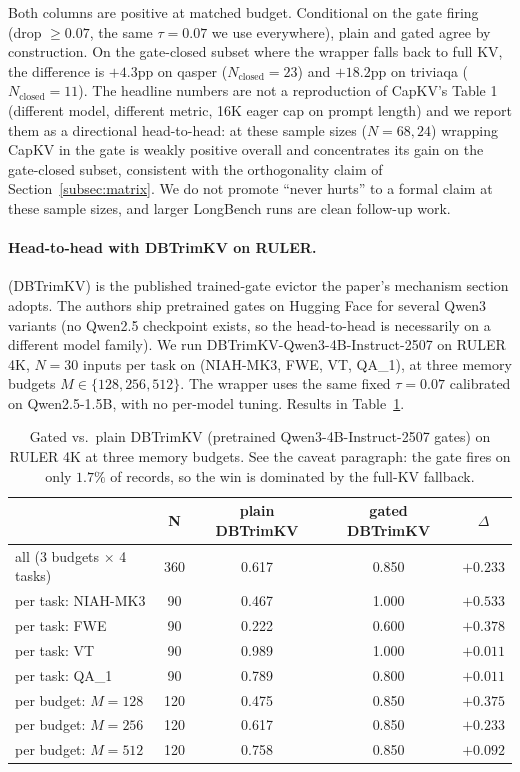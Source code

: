Both columns are positive at matched budget. Conditional on the gate
firing (drop $\geq 0.07$, the same $\tau = 0.07$ we use everywhere),
plain and gated agree by construction. On the gate-closed subset where
the wrapper falls back to full KV, the difference is $+4.3$pp on qasper
($N_{\text{closed}} = 23$) and $+18.2$pp on triviaqa
($N_{\text{closed}} = 11$). The headline numbers are not a reproduction
of CapKV's Table 1 (different model, different metric, 16K eager cap on
prompt length) and we report them as a directional head-to-head: at
these sample sizes ($N = 68, 24$) wrapping CapKV in the gate is
weakly positive overall and concentrates its gain on the gate-closed
subset, consistent with the orthogonality claim of
Section~\ref{subsec:matrix}. We do not promote ``never hurts'' to a
formal claim at these sample sizes, and larger LongBench runs are clean
follow-up work.

\paragraph{Head-to-head with DBTrimKV on RULER.}
\citet{arxiv260509649} (DBTrimKV) is the published trained-gate evictor
the paper's mechanism section adopts. The authors ship pretrained gates
on Hugging Face for several Qwen3 variants (no Qwen2.5 checkpoint
exists, so the head-to-head is necessarily on a different model
family). We run DBTrimKV-Qwen3-4B-Instruct-2507 on RULER 4K, $N = 30$
inputs per task on (NIAH-MK3, FWE, VT, QA\_1), at three memory budgets
$M \in \{128, 256, 512\}$. The wrapper uses the same fixed
$\tau = 0.07$ calibrated on Qwen2.5-1.5B, with no per-model tuning.
Results in Table~\ref{tab:dbtrimkv}.

\begin{table}[h]
\centering
\caption{Gated vs.\ plain DBTrimKV (pretrained Qwen3-4B-Instruct-2507
gates) on RULER 4K at three memory budgets. See the caveat paragraph:
the gate fires on only $1.7\%$ of records, so the win is dominated by
the full-KV fallback.}
\label{tab:dbtrimkv}
\begin{tabular}{lcccc}
\toprule
 & N & plain DBTrimKV & gated DBTrimKV & $\Delta$ \\
\midrule
all (3 budgets $\times$ 4 tasks) & 360 & 0.617 & 0.850 & $\boldsymbol{+0.233}$ \\
\midrule
per task: NIAH-MK3 & 90 & 0.467 & 1.000 & $+0.533$ \\
per task: FWE      & 90 & 0.222 & 0.600 & $+0.378$ \\
per task: VT       & 90 & 0.989 & 1.000 & $+0.011$ \\
per task: QA\_1    & 90 & 0.789 & 0.800 & $+0.011$ \\
\midrule
per budget: $M=128$ & 120 & 0.475 & 0.850 & $+0.375$ \\
per budget: $M=256$ & 120 & 0.617 & 0.850 & $+0.233$ \\
per budget: $M=512$ & 120 & 0.758 & 0.850 & $+0.092$ \\
\bottomrule
\end{tabular}
\end{table}

